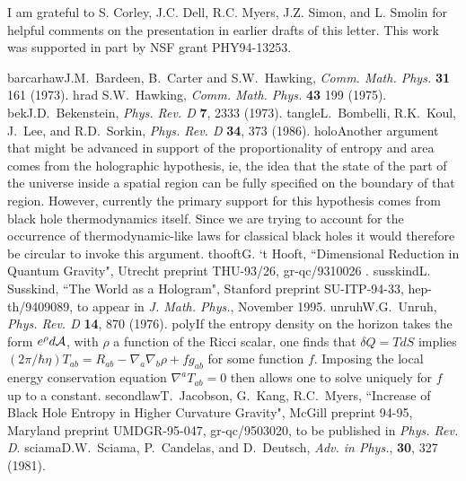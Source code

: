 \documentclass[12pt]{article}
\begin{document}
\vskip 1cm
I am grateful to S. Corley, J.C. Dell, R.C. Myers, J.Z. Simon, and
L. Smolin for helpful comments on the presentation in earlier
drafts of this letter.
This work was supported in part by NSF grant PHY94-13253.


\begin{thebibliography}{999999}
%
\bibitem%
{barcarhaw}J.M.~Bardeen, B.~Carter and S.W.~Hawking,
{\it Comm. Math. Phys.} {\bf 31} 161 (1973).
%
\bibitem%
{hrad}
S.W.~Hawking, {\sl Comm. Math. Phys.} {\bf 43} 199 (1975).
%
\bibitem%
{bek}J.D.~Bekenstein, {\sl Phys. Rev. D} {\bf 7}, 2333 (1973).
%
\bibitem%
{tangle}L.~Bombelli, R.K.~Koul, J.~Lee, and R.D.~Sorkin,
{\sl Phys. Rev. D} {\bf 34}, 373 (1986).
%
\bibitem%
{holo}Another
argument that might be advanced in support of the
proportionality of entropy and area comes from the holographic
hypothesis\cite{thooft,susskind},
ie, the idea that the state of the part of the
universe inside a spatial region can be fully specified
on the boundary of that region. However, currently the
primary support for this hypothesis comes from black hole
thermodynamics itself. Since we are trying to account for the
occurrence of thermodynamic-like laws for classical black
holes it would therefore be circular to invoke this argument.
%
\bibitem%
{thooft}G. `t Hooft, ``Dimensional Reduction in Quantum Gravity",
Utrecht preprint THU-93/26, gr-qc/9310026 .
%
\bibitem%
{susskind}L. Susskind, ``The World as a Hologram",
Stanford preprint SU-ITP-94-33, hep-th/9409089, to appear in
{\sl J. Math. Phys.}, November 1995.
%
\bibitem%
{unruh}W.G.~Unruh, {\sl Phys. Rev. D} {\bf 14}, 870 (1976).
%
\bibitem%
{poly}If the entropy density on the horizon takes the form
$e^\rho d{\cal A}$,
with $\rho$ a function of the Ricci scalar,
one finds that $\delta Q=T dS$ implies
$(2\pi/\hbar\eta)T_{ab}= R_{ab} -\nabla_a\nabla_b\rho + f g_{ab}$
for some function $f$\cite{secondlaw}.
Imposing the local energy conservation equation
$\nabla^a T_{ab}=0$ then allows one to solve uniquely for $f$
up to a constant.
%
\bibitem%
{secondlaw}T.~Jacobson, G.~Kang, R.C.~Myers,
``Increase of Black Hole Entropy in Higher Curvature Gravity",
McGill preprint
94-95, Maryland preprint UMDGR-95-047, gr-qc/9503020, to be published
in {\sl Phys. Rev. D}.
%
\bibitem%
{sciama}D.W.~Sciama, P.~Candelas, and D.~Deutsch, {\sl Adv. in Phys.},
{\bf 30}, 327 (1981).

\end{thebibliography}
\end{document}
